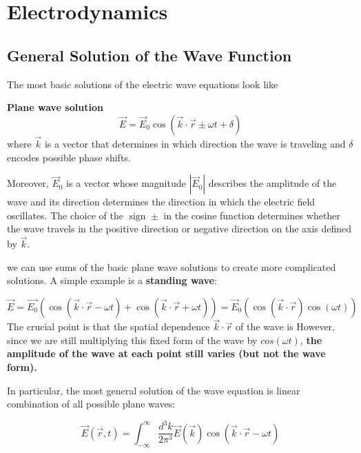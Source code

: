 \section{Electrodynamics}
\subsection{General Solution of the Wave Function}
The most basic solutions of the electric wave equations look like
\begin{qt}
\textbf{Plane wave solution}
\begin{equation}
\vec{E}=\vec{E}_{0} \cos (\vec{k} \cdot \vec{r} \pm \omega t+\delta)
\end{equation}
where $\vec{k}$ is a vector that determines in which direction the wave is traveling and $\delta$ encodes possible phase shifts.

Moreover, $\vec{E}_{0}$ is a vector whose magnitude $\left|\vec{E}_{0}\right|$ describes the amplitude of the wave and its direction determines the direction in which the electric field oscillates. The choice of the $\operatorname{sign} \pm$ in the cosine function determines whether the wave travels in the positive direction or negative direction on the axis defined by $\vec{k}$.
\end{qt}
we can use sums of the basic plane wave solutions to create more complicated solutions. A simple example is a \textbf{standing wave}:
\begin{qt}
\begin{equation}
\vec{E}=\overrightarrow{E_{0}}(\cos (\vec{k} \cdot \vec{r}-\omega t)+\cos (\vec{k} \cdot \vec{r}+\omega t))=\vec{E}_{0}(\cos (\vec{k} \cdot \vec{r}) \cos (\omega t))
\end{equation}
The crucial point is that the spatial dependence $\vec{k} \cdot \vec{r}$ of the wave is  However, since we are still multiplying this fixed form of the wave by $cos(\omega t)$, \textbf{the amplitude of the wave at each point still varies (but not the wave form).}
\end{qt}

In particular, the most general solution of the wave equation is linear combination of all possible plane waves:
\begin{qt}
\begin{equation}
\vec{E}(\vec{r}, t)=\int_{-\infty}^{\infty} \frac{d^{3} k}{2 \pi^{3}} \vec{E}(\vec{k}) \cos (\vec{k} \cdot \vec{r}-\omega t)
\end{equation}
\end{qt}

